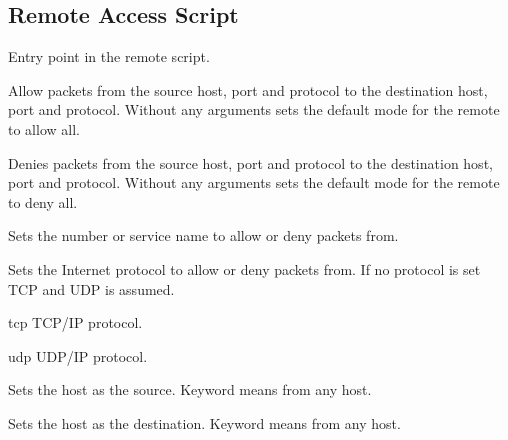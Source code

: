 \subsection{Remote Access Script}



Entry point in the remote script.


Allow packets from the source host, port and protocol to the destination
host, port and protocol. Without any arguments sets the default mode for the 
remote to allow all.


Denies packets from the source host, port and protocol to the destination
host, port and protocol.
Without any arguments sets the default mode for the remote to deny all.


Sets the  number or service name to allow or deny packets from.


Sets the Internet protocol to allow or deny packets from. If no protocol
is set TCP and UDP is assumed.

\begin{compactdesc}
\item[tcp] TCP/IP protocol.
\item[udp] UDP/IP protocol.
\end{compactdesc}


Sets the host as the source. Keyword  means from any host.


Sets the host as the destination. Keyword  means from any host.

